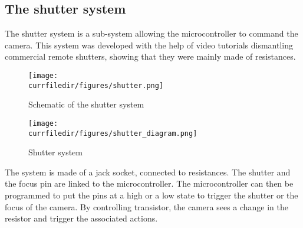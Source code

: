 \newpage
\subsection{The shutter system}
\label{shutter}
The shutter system is a sub-system allowing the microcontroller to command the camera. This system was developed with the help of video tutorials dismantling commercial remote shutters, showing that they were mainly made of resistances.
\begin{figure}[!h]
    \centering
    \texttt{[image: \\currfiledir/figures/shutter.png]}
    \caption{Schematic of the shutter system}
    \cite{JACK}
\end{figure}

\begin{figure}[!h]
    \centering
    \texttt{[image: \\currfiledir/figures/shutter\_diagram.png]}
    \caption{Shutter system}
\end{figure}

The system is made of a jack socket, connected to resistances. The shutter and the focus pin are linked to the microcontroller. The microcontroller can then be programmed to put the pins at a high or a low state to trigger the shutter or the focus of the camera. By controlling transistor, the camera sees a change in the resistor and trigger the associated actions.
